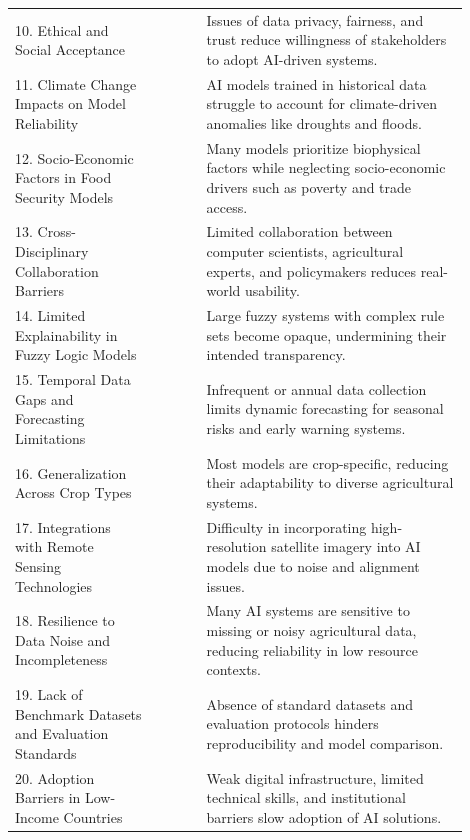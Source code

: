 \documentclass[preprint,12pt]{elsarticle}
\begin{document}
\begin{longtable}{@{}p{0.28\linewidth}p{0.10\linewidth}p{0.52\linewidth}@{}}
		10. Ethical and Social Acceptance & \cite{ref61,ref4} & Issues of data privacy, fairness, and trust reduce willingness of stakeholders to adopt AI-driven systems. \\
		11. Climate Change Impacts on Model Reliability & \cite{ref84} & AI models trained in historical data struggle to account for climate-driven anomalies like droughts and floods. \\
		12. Socio-Economic Factors in Food Security Models & \cite{ref85} & Many models prioritize biophysical factors while neglecting socio-economic drivers such as poverty and trade access. \\
		13. Cross-Disciplinary Collaboration Barriers & \cite{ref86} & Limited collaboration between computer scientists, agricultural experts, and policymakers reduces real-world usability. \\
		14. Limited Explainability in Fuzzy Logic Models & \cite{ref87} & Large fuzzy systems with complex rule sets become opaque, undermining their intended transparency. \\
		15. Temporal Data Gaps and Forecasting Limitations & \cite{ref88} & Infrequent or annual data collection limits dynamic forecasting for seasonal risks and early warning systems. \\
		16. Generalization Across Crop Types & \cite{ref89} & Most models are crop-specific, reducing their adaptability to diverse agricultural systems. \\
		17. Integrations with Remote Sensing Technologies & \cite{ref90} & Difficulty in incorporating high-resolution satellite imagery into AI models due to noise and alignment issues. \\
		18. Resilience to Data Noise and Incompleteness & \cite{ref91} & Many AI systems are sensitive to missing or noisy agricultural data, reducing reliability in low resource contexts. \\
		19. Lack of Benchmark Datasets and Evaluation Standards & \cite{ref92} & Absence of standard datasets and evaluation protocols hinders reproducibility and model comparison. \\
		20. Adoption Barriers in Low-Income Countries & \cite{ref93} & Weak digital infrastructure, limited technical skills, and institutional barriers slow adoption of AI solutions. \\
		\bottomrule
	\end{longtable}
	
\end{document}
